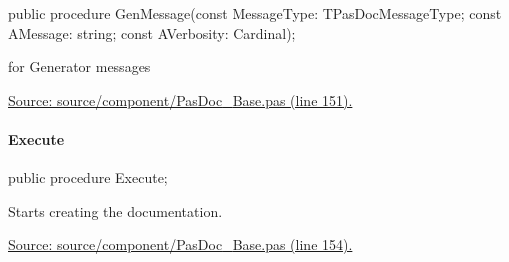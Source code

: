 \documentclass{report}
\newif\ifpdf
\begin{document}
\label{PasDoc_Base.TPasDoc-GenMessage}
\begin{list}{}{
\setlength{\itemindent}{0cm}
\setlength{\listparindent}{0cm}
\setlength{\leftmargin}{\evensidemargin}
\addtolength{\leftmargin}{\tmplength}
\settowidth{\labelsep}{X}
\addtolength{\leftmargin}{\labelsep}
\setlength{\labelwidth}{\tmplength}
}
\item[\textbf{Declaration}\hfill]
\ifpdf
\begin{flushleft}
\fi
\begin{ttfamily}
public procedure GenMessage(const MessageType: TPasDocMessageType; const AMessage: string; const AVerbosity: Cardinal);\end{ttfamily}

\ifpdf
\end{flushleft}
\fi

\par
\item[\textbf{Description}]
for Generator messages\par
\href{https://github.com/pasdoc/pasdoc/blob/master/source/component/PasDoc_Base.pas#L151}{Source: source/component/PasDoc{\_}Base.pas (line 151).}

\end{list}
\paragraph*{Execute}\hspace*{\fill}

\label{PasDoc_Base.TPasDoc-Execute}
\begin{list}{}{
\setlength{\itemindent}{0cm}
\setlength{\listparindent}{0cm}
\setlength{\leftmargin}{\evensidemargin}
\addtolength{\leftmargin}{\tmplength}
\settowidth{\labelsep}{X}
\addtolength{\leftmargin}{\labelsep}
\setlength{\labelwidth}{\tmplength}
}
\item[\textbf{Declaration}\hfill]
\ifpdf
\begin{flushleft}
\fi
\begin{ttfamily}
public procedure Execute;\end{ttfamily}

\ifpdf
\end{flushleft}
\fi

\par
\item[\textbf{Description}]
Starts creating the documentation.\par
\href{https://github.com/pasdoc/pasdoc/blob/master/source/component/PasDoc_Base.pas#L154}{Source: source/component/PasDoc{\_}Base.pas (line 154).}

\end{list}
\end{document}
